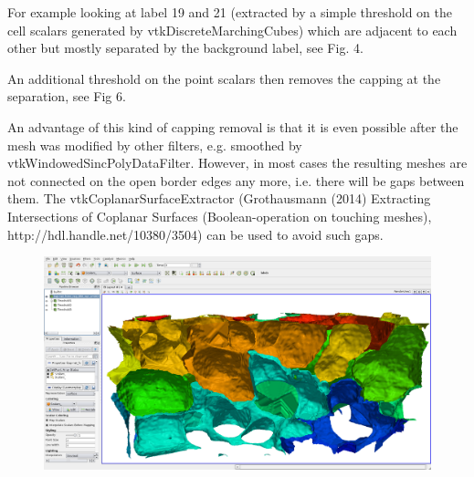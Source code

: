 \documentclass{InsightArticle}
\begin{document}
For example looking at label 19 and 21 (extracted by a simple threshold on the cell scalars generated by vtkDiscreteMarchingCubes) which are adjacent to each other but mostly separated by the background label, see Fig. 4.

An additional threshold on the point scalars then removes the capping at the separation, see Fig 6.

An advantage of this kind of capping removal is that it is even possible after the mesh was modified by other filters, e.g. smoothed by vtkWindowedSincPolyDataFilter. However, in most cases the resulting meshes are not connected on the open border edges any more, i.e. there will be gaps between them. The vtkCoplanarSurfaceExtractor (Grothausmann (2014) Extracting Intersections of Coplanar Surfaces (Boolean-operation on touching meshes), http://hdl.handle.net/10380/3504) can be used to avoid such gaps.



\begin{figure}
\center
\includegraphics[width=\textwidth]{images/vtkDiscreteMarchingCubes_extension_01}
\label{fig:}
\end{figure}
\end{document}
